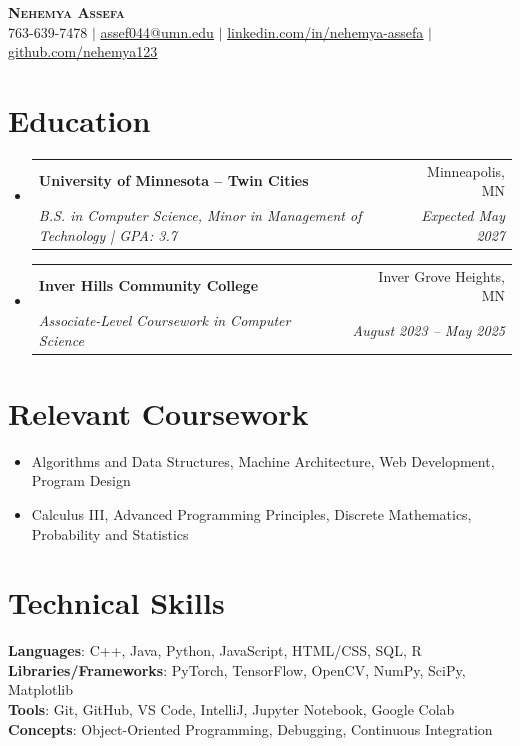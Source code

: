\documentclass[letterpaper,10pt]{article}
\makeatletter
\newcommand{\resumeItem}[1]{
  \item\small{{#1 \vspace{-2pt}}}
}
\newcommand{\resumeSubheading}[4]{
  \vspace{-2pt}\item
    \begin{tabular*}{0.97\textwidth}[t]{l@{\extracolsep{\fill}}r}
      \textbf{#1} & #2 \\
      \textit{\small #3} & \textit{\small #4} \\
    \end{tabular*}\vspace{-7pt}
}
\newcommand{\resumeSubHeadingListStart}{\begin{itemize}[leftmargin=0.15in, label={}]}
\newcommand{\resumeSubHeadingListEnd}{\end{itemize}}
\newcommand{\resumeItemListStart}{\begin{itemize}}
\newcommand{\resumeItemListEnd}{\end{itemize}\vspace{-5pt}}
\makeatother
\begin{document}
\begin{center}
    \textbf{\Huge \scshape Nehemya Assefa} \\ \vspace{1pt}
    \small 763-639-7478 $|$ \href{mailto:assef044@umn.edu}{\underline{assef044@umn.edu}} $|$
    \href{https://www.linkedin.com/in/nehemya-assefa}{\underline{linkedin.com/in/nehemya-assefa}} $|$
    \href{https://github.com/nehemya123}{\underline{github.com/nehemya123}}
\end{center}

\section{Education}
\resumeSubHeadingListStart
    \resumeSubheading
      {University of Minnesota -- Twin Cities}{Minneapolis, MN}
      {B.S. in Computer Science, Minor in Management of Technology | GPA: 3.7}{Expected May 2027}

    \resumeSubheading
      {Inver Hills Community College}{Inver Grove Heights, MN}
      {Associate-Level Coursework in Computer Science}{August 2023 -- May 2025}
\resumeSubHeadingListEnd

\section{Relevant Coursework}
\resumeItemListStart
    \resumeItem{Algorithms and Data Structures, Machine Architecture, Web Development, Program Design}
    \resumeItem{Calculus III, Advanced Programming Principles, Discrete Mathematics, Probability and Statistics}
\resumeItemListEnd

\section{Technical Skills}
\begin{itemize}[leftmargin=0.15in, label={}]
\small{\item{
 \textbf{Languages}{: C++, Java, Python, JavaScript, HTML/CSS, SQL, R} \\
 \textbf{Libraries/Frameworks}{: PyTorch, TensorFlow, OpenCV, NumPy, SciPy, Matplotlib} \\
 \textbf{Tools}{: Git, GitHub, VS Code, IntelliJ, Jupyter Notebook, Google Colab} \\
 \textbf{Concepts}{: Object-Oriented Programming, Debugging, Continuous Integration}
}}
\end{itemize}
\end{document}
